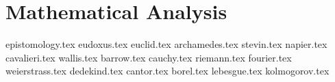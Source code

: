 \part{Mathematical Analysis}

{epistomology.tex}
{eudoxus.tex}
{euclid.tex}
{archamedes.tex}
{stevin.tex}
{napier.tex}
{cavalieri.tex}
{wallis.tex}
{barrow.tex}
{cauchy.tex}
{riemann.tex}
{fourier.tex}
{weierstrass.tex}
{dedekind.tex}
{cantor.tex}
{borel.tex}
{lebesgue.tex}
{kolmogorov.tex}